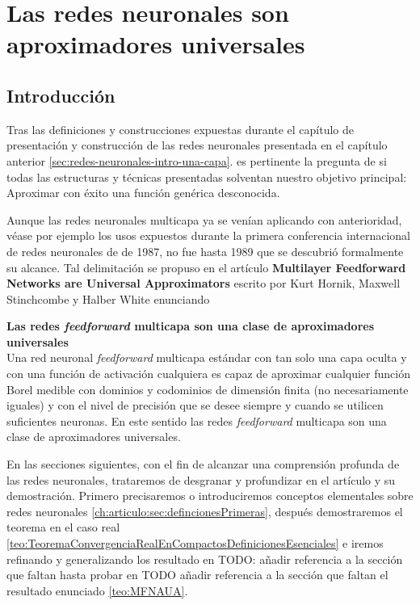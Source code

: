 %

\chapter{Las redes neuronales  son aproximadores universales}  
\label{chapter:redes-neuronales-aproximador-universal}
\section{Introducción}  

Tras las definiciones y construcciones expuestas durante el capítulo de presentación 
y construcción de las redes neuronales  presentada en el capítulo anterior \ref{sec:redes-neuronales-intro-una-capa}.
es pertinente la pregunta de si todas las estructuras y técnicas presentadas solventan nuestro 
objetivo principal: Aproximar con éxito una función genérica desconocida.   

Aunque las redes neuronales multicapa ya se venían aplicando con anterioridad, 
véase por ejemplo los usos expuestos durante la primera conferencia
internacional de redes neuronales de \cite{4307059} de 1987, 
no fue hasta 1989 que se descubrió formalmente su alcance.
 Tal delimitación se propuso en el artículo 
\textbf{Multilayer Feedforward Networks are Universal Approximators} \cite{HORNIK1989359}
 escrito por Kurt Hornik, Maxwell Stinchcombe y Halber White enunciando 

\begin{teorema}\textbf{Las redes \textit{feedforward} multicapa son una clase de aproximadores universales } \label{teo:MFNAUA}
    \\
    Una red neuronal \textit{feedforward} multicapa estándar con tan solo una capa oculta y con una función de activación cualquiera es capaz de aproximar cualquier 
    función Borel medible  con dominios y codominios de dimensión finita (no necesariamente iguales) y con el nivel de precisión que se desee siempre y cuando 
    se utilicen suficientes neuronas. En este sentido las redes \textit{feedforward} multicapa son una clase de aproximadores universales.

\end{teorema}

En las secciones siguientes, con el fin de alcanzar una comprensión profunda de las redes neuronales,
trataremos de desgranar y profundizar en el artículo y su demostración. Primero precisaremos o introduciremos conceptos elementales 
sobre redes neuronales \ref{ch:articulo:sec:defincionesPrimeras}, después demostraremos el teorema en el caso real 
\ref{teo:TeoremaConvergenciaRealEnCompactosDefinicionesEsenciales} e iremos refinando y generalizando los resultado 
en 
TODO: añadir referencia a la sección  que faltan 
hasta probar en 
TODO añadir referencia a la sección  que faltan 
el resultado enunciado \ref{teo:MFNAUA}.


